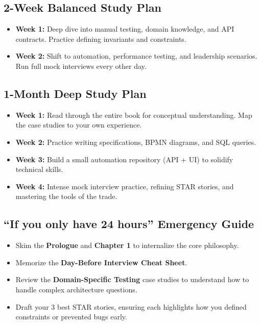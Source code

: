 \subsection{2-Week Balanced Study Plan}\label{week-balanced-study-plan}

\begin{itemize}
\tightlist
\item
  \textbf{Week 1:} Deep dive into manual testing, domain knowledge, and
  API contracts. Practice defining invariants and constraints.
\item
  \textbf{Week 2:} Shift to automation, performance testing, and
  leadership scenarios. Run full mock interviews every other day.
\end{itemize}

\subsection{1-Month Deep Study Plan}\label{month-deep-study-plan}

\begin{itemize}
\tightlist
\item
  \textbf{Week 1:} Read through the entire book for conceptual
  understanding. Map the case studies to your own experience.
\item
  \textbf{Week 2:} Practice writing specifications, BPMN diagrams, and
  SQL queries.
\item
  \textbf{Week 3:} Build a small automation repository (API + UI) to
  solidify technical skills.
\item
  \textbf{Week 4:} Intense mock interview practice, refining STAR
  stories, and mastering the tools of the trade.
\end{itemize}

\subsection{``If you only have 24 hours'' Emergency
Guide}\label{if-you-only-have-24-hours-emergency-guide}

\begin{itemize}
\tightlist
\item
  Skim the \textbf{Prologue} and \textbf{Chapter 1} to internalize the
  core philosophy.
\item
  Memorize the \textbf{Day-Before Interview Cheat Sheet}.
\item
  Review the \textbf{Domain-Specific Testing} case studies to understand
  how to handle complex architecture questions.
\item
  Draft your 3 best STAR stories, ensuring each highlights how you
  defined constraints or prevented bugs early.
\end{itemize}


